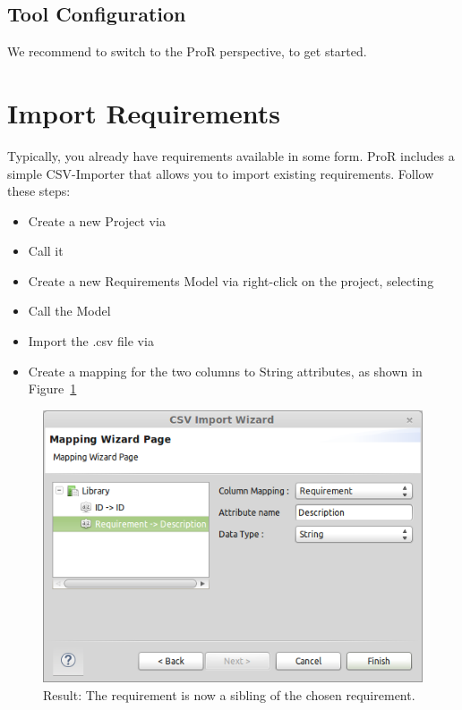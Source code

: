 \subsection{Tool Configuration}

We recommend to switch to the ProR perspective, to get started.

\section{Import Requirements}

Typically, you already have requirements available in some form.  ProR includes a simple CSV-Importer that allows you to import existing requirements.  Follow these steps:

\begin{itemize}
\item Create a new Project via 
\item Call it 
\item Create a new Requirements Model via right-click on the project, selecting 
\item Call the Model 
\item Import the .csv file via 
\item Create a mapping for the two columns to String attributes, as shown in Figure~\ref{fig:csv-import}
\end{itemize}

\begin{figure}[h!]
  \centering
  \includegraphics[width=\linewidth]{../se-images/csv-import.png}
  \caption{Result: The requirement is now a sibling of the chosen requirement.}
  \label{fig:csv-import}
\end{figure}

